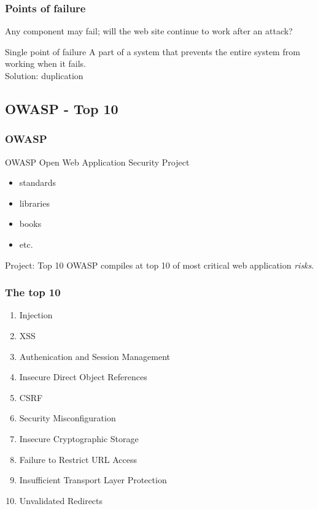 
\begin{frame}
\frametitle{Points of failure}
Any component may fail; will the web site continue to work after an attack?
\begin{block}{Single point of failure}
A part of a system that prevents the entire system from working when it fails.
\\ Solution: duplication
\end{block}
\end{frame}

\subsection{OWASP - Top 10}

\begin{frame}
\frametitle{OWASP}
\begin{block}{OWASP}
\centering Open Web Application Security Project
\begin{itemize}
\item standards
\item libraries
\item books
\item etc.
\end{itemize}
\end{block}
\begin{block}{Project: Top 10}
OWASP compiles at top 10 of most critical web application \emph{risks}.
\end{block}
\end{frame}

\begin{frame}
\frametitle{The top 10}
\begin{enumerate}
\item Injection
\item XSS
\item Authenication and Session Management
\item Insecure Direct Object References
\item CSRF
\item Security Misconfiguration
\item Insecure Cryptographic Storage
\item Failure to Restrict URL Access
\item Insufficient Transport Layer Protection
\item Unvalidated Redirects
\end{enumerate}
\end{frame}

